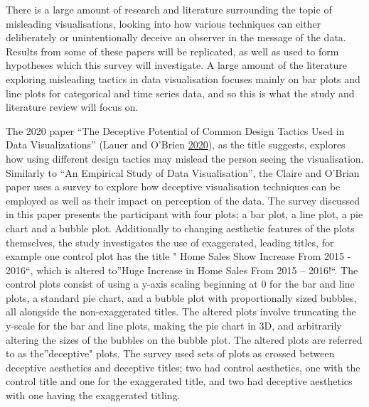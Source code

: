 \documentclass[
  11pt,
]{book}
\begin{document}
There is a large amount of research and literature surrounding the topic
of misleading visualisations, looking into how various techniques can
either deliberately or unintentionally deceive an observer in the
message of the data. Results from some of these papers will be
replicated, as well as used to form hypotheses which this survey will
investigate. A large amount of the literature exploring misleading
tactics in data visualisation focuses mainly on bar plots and line plots
for categorical and time series data, and so this is what the study and
literature review will focus on.

The 2020 paper ``The Deceptive Potential of Common Design Tactics Used
in Data Visualizations'' (Lauer and O'Brien
\protect\hyperlink{ref-claire-obrian}{2020}), as the title suggests,
explores how using different design tactics may mislead the person
seeing the visualisation. Similarly to ``An Empirical Study of Data
Visualisation'', the Claire and O'Brian paper uses a survey to explore
how deceptive visualisation techniques can be employed as well as their
impact on perception of the data. The survey discussed in this paper
presents the participant with four plots; a bar plot, a line plot, a pie
chart and a bubble plot. Additionally to changing aesthetic features of
the plots themselves, the study investigates the use of exaggerated,
leading titles, for example one control plot has the title " Home Sales
Show Increase From 2015 - 2016``, which is altered to''Huge Increase in
Home Sales From 2015 -- 2016!``. The control plots consist of using a
y-axis scaling beginning at 0 for the bar and line plots, a standard pie
chart, and a bubble plot with proportionally sized bubbles, all
alongside the non-exaggerated titles. The altered plots involve
truncating the y-scale for the bar and line plots, making the pie chart
in 3D, and arbitrarily altering the sizes of the bubbles on the bubble
plot. The altered plots are referred to as the''deceptive" plots. The
survey used sets of plots as crossed between deceptive aesthetics and
deceptive titles; two had control aesthetics, one with the control title
and one for the exaggerated title, and two had deceptive aesthetics with
one having the exaggerated titling.
\end{document}
